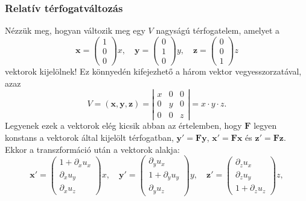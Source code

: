 \documentclass[12pt,a4paper]{scrartcl}
\let\mathbf\bm
\begin{document}
\subsubsection{Relatív térfogatváltozás}
Nézzük meg, hogyan változik meg egy $V$ nagyságú térfogatelem, amelyet a
\[{\mathbf{x}} = \left( {\begin{array}{*{20}{c}}
  1 \\ 
  0 \\ 
  0 
\end{array}} \right)x,\quad {\mathbf{y}} = \left( {\begin{array}{*{20}{c}}
  0 \\ 
  1 \\ 
  0 
\end{array}} \right)y,\quad {\mathbf{z}} = \left( {\begin{array}{*{20}{c}}
  0 \\ 
  0 \\ 
  1 
\end{array}} \right)z\]
vektorok kijelölnek! Ez könnyedén kifejezhető a három vektor vegyesszorzatával, azaz
\[V = \left( {{\mathbf{x}},{\mathbf{y}},{\mathbf{z}}} \right) = \left| {\begin{array}{*{20}{c}}
  x&0&0 \\ 
  0&y&0 \\ 
  0&0&z 
\end{array}} \right| = x \cdot y \cdot z.\]
Legyenek ezek a vektorok elég kicsik abban az értelemben, hogy ${\mathbf{F}}$ legyen konstans a vektorok által kijelölt térfogatban, ${\mathbf{y}}' = {\mathbf{Fy}}$, ${\mathbf{x}}' = {\mathbf{Fx}}$ és ${\mathbf{z}}' = {\mathbf{Fz}}$. Ekkor a transzformáció után a vektorok alakja:
\[{\mathbf{x}}' = \left( {\begin{array}{*{20}{c}}
  {1 + {\partial _x}{u_x}} \\ 
  {{\partial _x}{u_y}} \\ 
  {{\partial _x}{u_z}} 
\end{array}} \right)x,\quad {\mathbf{y}}' = \left( {\begin{array}{*{20}{c}}
  {{\partial _y}{u_x}} \\ 
  {1 + {\partial _y}{u_y}} \\ 
  {{\partial _y}{u_z}} 
\end{array}} \right)y,\quad {\mathbf{z}}' = \left( {\begin{array}{*{20}{c}}
  {{\partial _z}{u_x}} \\ 
  {{\partial _z}{u_y}} \\ 
  {1 + {\partial _z}{u_z}} 
\end{array}} \right)z,\]
\end{document}
